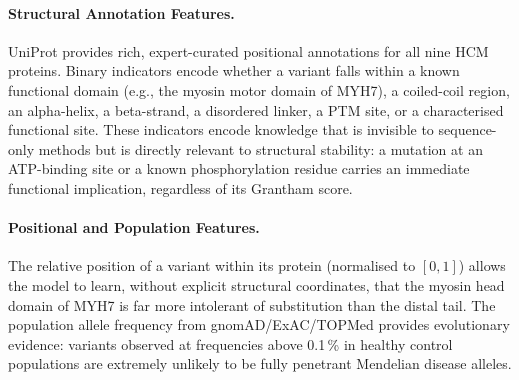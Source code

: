 \documentclass[12pt,a4paper]{article}
\begin{document}
\paragraph{Structural Annotation Features.}
UniProt provides rich, expert-curated positional annotations for all nine
HCM proteins. Binary indicators encode whether a variant falls within a
known functional domain (e.g., the myosin motor domain of MYH7), a
coiled-coil region, an alpha-helix, a beta-strand, a disordered linker, a
PTM site, or a characterised functional site. These indicators encode
knowledge that is invisible to sequence-only methods but is directly
relevant to structural stability: a mutation at an ATP-binding site or a
known phosphorylation residue carries an immediate functional implication,
regardless of its Grantham score.

\paragraph{Positional and Population Features.}
The relative position of a variant within its protein (normalised to
$[0,1]$) allows the model to learn, without explicit structural coordinates,
that the myosin head domain of MYH7 is far more intolerant of substitution
than the distal tail. The population allele frequency from gnomAD/ExAC/TOPMed
provides evolutionary evidence: variants observed at frequencies above
0.1\,\% in healthy control populations are extremely unlikely to be
fully penetrant Mendelian disease alleles.
\end{document}
